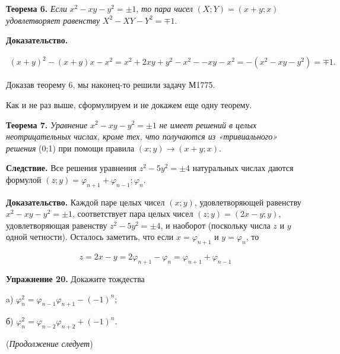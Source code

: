 \begin{multicols}{2}
\textbf{Теорема 6.} \textit{Если} \(x^{2} - xy - y^{2} = \pm 1\), \textit{то пара чисел}
\((X;Y) = (x + y; x)\) \textit{удовлетворяет равенству} \(X^{2} - XY - Y^{2} = \mp 1 \).

\textbf{Доказательство.}

\begin{multline*}
(x+y)^{2} - (x+y)x-x^{2}=x^{2}+2xy+y^{2}-x^{2}- -xy-x^{2}= -(x^{2}-xy-y^{2})=\mp 1.
\end{multline*}

Доказав теорему 6, мы наконец-то решили задачу М1775.

Как и не раз выше, сформулируем и не докажем еще одну теорему.

\textbf{Теорема 7.} \textit{Уравнение} \(x^{2} - xy - y^{2} = \pm 1\) \textit{не имеет решений в целых неотрицательных числах, кроме тех, что получаются из «тривиального» решения} (0;1) при помощи правила \((x;y) \to  (x+y;x).\)

\textbf{Следствие.} Все решения уравнения \(z^{2}-5y^{2}=\pm 4\) натуральных числах даются формулой \((z;y) = \varphi_{n+1} + \varphi_{n-1}; \varphi_{n}\).

\textbf{Доказательство.} Каждой паре целых чисел \((x;y)\), удовлетворяющей равенству \(x^{2} - xy - y^{2} = \pm 1\), соответствует пара целых чисел \((z;y)=(2x-y;y)\), удовлетворяющая равенству \(z^{2}-5y^{2}=\pm 4\), и наоборот (поскольку числа \(z\) и \(y\) одной четности). Осталось заметить, что если \(x = \varphi_{n+1}\) и \(y = \varphi_{n}\), то

\[z=2x-y=2\varphi_{n+1}-\varphi_{n}=\varphi_{n+1}+\varphi_{n-1}\]

\textbf{Упражнение 20.} Докажите тождества

\noindent a) \(\varphi^{2}_{n} = \varphi_{n-1}\varphi_{n+1}-(-1)^{n}\);

\noindent б) \(\varphi^{2}_{n} = \varphi_{n-2}\varphi_{n+2}+(-1)^{n}\).

\begin{center}
    (\textit{Продолжение следует})
\end{center}

\end{multicols}
